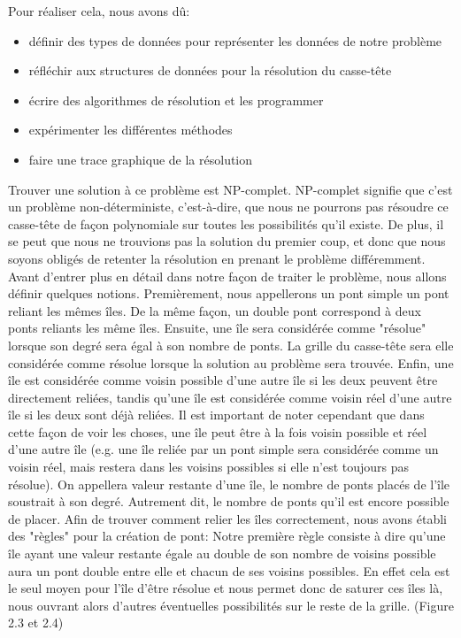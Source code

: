Pour réaliser cela, nous avons dû:
\begin{itemize}
    \item définir des types de données pour représenter les données de notre problème
    \item réfléchir aux structures de données pour la résolution du casse-tête
    \item écrire des algorithmes de résolution et les programmer
    \item expérimenter les différentes méthodes
    \item faire une trace graphique de la résolution
\end{itemize}

\smallbreak
Trouver une solution à ce problème est NP-complet. NP-complet signifie que c'est un problème non-déterministe, c'est-à-dire, que nous ne pourrons pas résoudre ce casse-tête de façon polynomiale sur toutes les possibilités qu'il existe. De plus, il se peut que nous ne trouvions pas la solution du premier coup, et donc que nous soyons obligés de retenter la résolution en prenant le problème différemment. 
\smallbreak
Avant d'entrer plus en détail dans notre façon de traiter le problème, nous allons définir quelques notions. Premièrement, nous appellerons un pont simple un pont reliant les mêmes îles. De la même façon, un double pont correspond à deux ponts reliants les même îles.
\newline
Ensuite, une île sera considérée comme "résolue" lorsque son degré sera égal à son nombre de ponts. La grille du casse-tête sera elle considérée comme résolue lorsque la solution au problème sera trouvée.
\newline
Enfin, une île est considérée comme voisin possible d'une autre île si les deux peuvent être directement reliées, tandis qu'une île est considérée comme voisin réel d'une autre île si les deux sont déjà reliées. Il est important de noter cependant que dans cette façon de voir les choses, une île peut être à la fois voisin possible et réel d'une autre île (e.g. une île reliée par un pont simple sera considérée comme un voisin réel, mais restera dans les voisins possibles si elle n'est toujours pas résolue).
On appellera valeur restante d'une île, le nombre de ponts placés de l'île soustrait à son degré. Autrement dit, le nombre de ponts qu'il est encore possible de placer.
\smallbreak
Afin de trouver comment relier les îles correctement, nous avons établi des "règles" pour la création de pont: Notre première règle consiste à dire qu'une île ayant une valeur restante égale au double de son nombre de voisins possible aura un pont double entre elle et chacun de ses voisins possibles. En effet cela est le seul moyen pour l'île d'être résolue et nous permet donc de saturer ces îles là, nous ouvrant alors d'autres éventuelles possibilités sur le reste de la grille. (Figure 2.3 et 2.4)\newline

